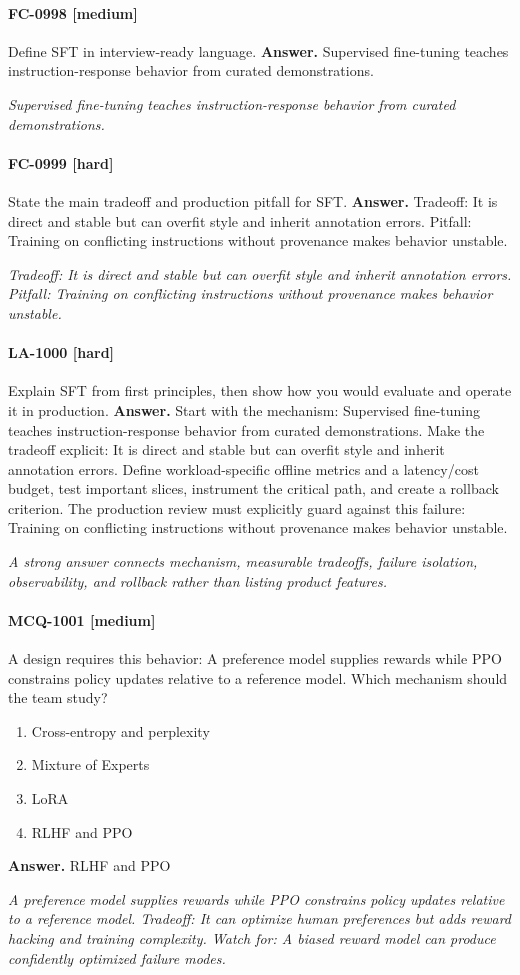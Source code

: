 \paragraph{FC-0998 [medium]} Define SFT in interview-ready language.
\noindent\textbf{Answer.} Supervised fine-tuning teaches instruction-response behavior from curated demonstrations.
\par\textit{Supervised fine-tuning teaches instruction-response behavior from curated demonstrations.}
\paragraph{FC-0999 [hard]} State the main tradeoff and production pitfall for SFT.
\noindent\textbf{Answer.} Tradeoff: It is direct and stable but can overfit style and inherit annotation errors. Pitfall: Training on conflicting instructions without provenance makes behavior unstable.
\par\textit{Tradeoff: It is direct and stable but can overfit style and inherit annotation errors. Pitfall: Training on conflicting instructions without provenance makes behavior unstable.}
\paragraph{LA-1000 [hard]} Explain SFT from first principles, then show how you would evaluate and operate it in production.
\noindent\textbf{Answer.} Start with the mechanism: Supervised fine-tuning teaches instruction-response behavior from curated demonstrations. Make the tradeoff explicit: It is direct and stable but can overfit style and inherit annotation errors. Define workload-specific offline metrics and a latency/cost budget, test important slices, instrument the critical path, and create a rollback criterion. The production review must explicitly guard against this failure: Training on conflicting instructions without provenance makes behavior unstable.
\par\textit{A strong answer connects mechanism, measurable tradeoffs, failure isolation, observability, and rollback rather than listing product features.}
\paragraph{MCQ-1001 [medium]} A design requires this behavior: A preference model supplies rewards while PPO constrains policy updates relative to a reference model. Which mechanism should the team study?
\begin{enumerate}[label=\Alph*.]
\item Cross-entropy and perplexity
\item Mixture of Experts
\item LoRA
\item RLHF and PPO
\end{enumerate}
\noindent\textbf{Answer.} RLHF and PPO
\par\textit{A preference model supplies rewards while PPO constrains policy updates relative to a reference model. Tradeoff: It can optimize human preferences but adds reward hacking and training complexity. Watch for: A biased reward model can produce confidently optimized failure modes.}
